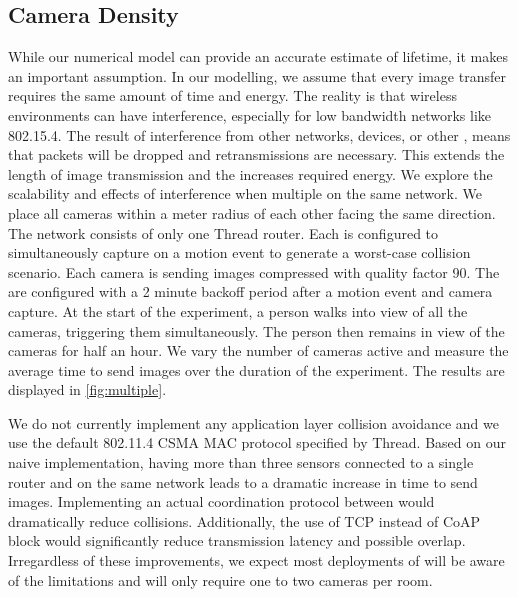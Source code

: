 \subsection{Camera Density}
While our numerical model can provide an accurate estimate of lifetime, it makes an important assumption. In our modelling, we assume that every image transfer requires the same amount of time and energy. The reality is that wireless environments can have interference, especially for low bandwidth networks like 802.15.4. The result of interference from other networks, devices, or other \names, means that packets will be dropped and retransmissions are necessary. This extends the length of image transmission and the increases required energy. 
We explore the scalability and effects of interference when multiple \names on the same network. We place all cameras within a meter radius of each other facing the same direction. The network consists of only one Thread router. Each \name is configured to simultaneously capture on a motion event to generate a worst-case collision scenario. Each camera is sending images compressed with quality factor 90.
The \names are configured with a 2 minute backoff period after a motion event and camera capture. At the start of the experiment, a person walks into view of all the cameras, triggering them simultaneously. The person then remains in view of the cameras for half an hour. We vary the number of cameras active and measure the average time to send images over the duration of the experiment. The results are displayed in \cref{fig:multiple}.

We do not currently implement any application layer collision avoidance and we use the default 802.11.4 CSMA MAC protocol specified by Thread. Based on our naive implementation, having more than three \name sensors connected to a single router and on the same network leads to a dramatic increase in time to send images. Implementing an actual coordination protocol between \names would dramatically reduce collisions. Additionally, the use of  TCP instead of CoAP block would significantly reduce transmission latency and possible overlap.
Irregardless of these improvements, we expect most deployments of \name will be aware of the limitations and will only require one to two cameras per room.

